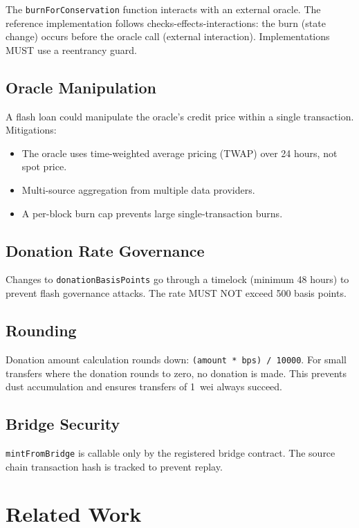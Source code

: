 \documentclass[11pt,letterpaper]{article}
\begin{document}
The \texttt{burnForConservation} function interacts with an external oracle. The reference implementation follows checks-effects-interactions: the burn (state change) occurs before the oracle call (external interaction). Implementations MUST use a reentrancy guard.

\subsection{Oracle Manipulation}

A flash loan could manipulate the oracle's credit price within a single transaction. Mitigations:

\begin{itemize}
    \item The oracle uses time-weighted average pricing (TWAP) over 24 hours, not spot price.
    \item Multi-source aggregation from multiple data providers.
    \item A per-block burn cap prevents large single-transaction burns.
\end{itemize}

\subsection{Donation Rate Governance}

Changes to \texttt{donationBasisPoints} go through a timelock (minimum 48 hours) to prevent flash governance attacks. The rate MUST NOT exceed 500 basis points.

\subsection{Rounding}

Donation amount calculation rounds down: \texttt{(amount * bps) / 10000}. For small transfers where the donation rounds to zero, no donation is made. This prevents dust accumulation and ensures transfers of 1~wei always succeed.

\subsection{Bridge Security}

\texttt{mintFromBridge} is callable only by the registered bridge contract. The source chain transaction hash is tracked to prevent replay.

\section{Related Work}
\end{document}
